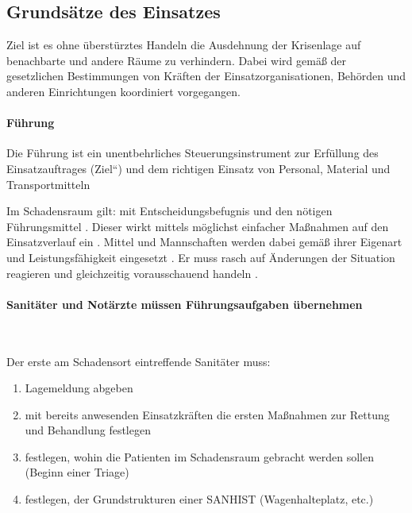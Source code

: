 \subsection{Grundsätze des Einsatzes}


Ziel ist es ohne überstürztes Handeln die Ausdehnung der Krisenlage
auf benachbarte und andere Räume zu verhindern. Dabei wird
gemäß der gesetzlichen Bestimmungen von Kräften der
Einsatzorganisationen, Behörden und anderen Einrichtungen koordiniert
vorgegangen.

\paragraph{Führung}

Die Führung ist ein unentbehrliches Steuerungsinstrument zur
Erfüllung des Einsatzauftrages
({\quotedblbase}Ziel{\textquotedblleft}) und dem richtigen Einsatz von
Personal, Material und Transportmitteln 

Im Schadensraum gilt: {\quotedblbase} mit Entscheidungsbefugnis und den
nötigen Führungsmittel . Dieser wirkt mittels möglichst
einfacher Ma{\ss}nahmen 
auf den Einsatzverlauf ein
. Mittel und
Mannschaften werden dabei gemäß ihrer Eigenart und
Leistungsfähigkeit eingesetzt . Er muss rasch auf \"Anderungen der
Situation reagieren 
und gleichzeitig vorausschauend handeln
.


\paragraph{Sanitäter und Notärzte müssen Führungsaufgaben
übernehmen}~

Der erste am Schadensort eintreffende Sanitäter muss:

\begin{enumerate}
    \item Lagemeldung abgeben
    \item mit bereits anwesenden Einsatzkräften die ersten Maßnahmen
    zur Rettung und Behandlung festlegen
    \item festlegen, wohin die Patienten im Schadensraum gebracht werden 
    sollen (Beginn einer Triage)
    \item festlegen, der Grundstrukturen einer SANHIST (Wagenhalteplatz, etc.)
\end{enumerate}

